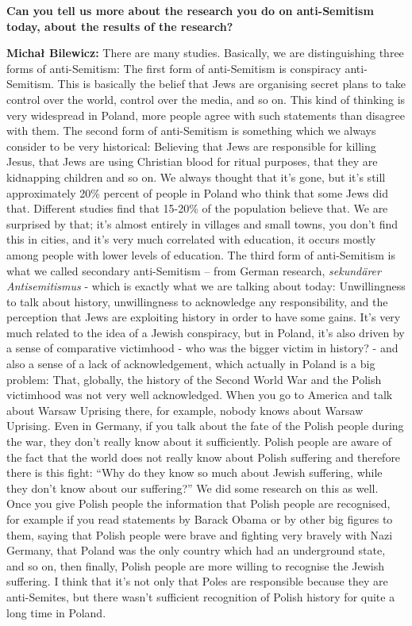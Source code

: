 \textbf{Can you tell us more about the research you do on anti-Semitism today, about the results of the research?} 

\textbf{Michał Bilewicz:} There are many studies. Basically, we are distinguishing three forms of anti-Semitism: The first form of anti-Semitism is conspiracy anti-Semitism. This is basically the belief that Jews are organising secret plans to take control over the world, control over the media, and so on. This kind of thinking is very widespread in Poland, more people agree with such statements than disagree with them. The second form of anti-Semitism is something which we always consider to be very historical: Believing that Jews are responsible for killing Jesus, that Jews are using Christian blood for ritual purposes, that they are kidnapping children and so on. We always thought that it’s gone, but it’s still approximately 20\% percent of people in Poland who think that some Jews did that. Different studies find that 15-20\% of the population believe that. We are surprised by that; it’s almost entirely in villages and small towns, you don’t find this in cities, and it’s very much correlated with education, it occurs mostly among people with lower levels of education. The third form of anti-Semitism is what we called secondary anti-Semitism – from German research, \textit{sekundärer Antisemitismus} - which is exactly what we are talking about today: Unwillingness to talk about history, unwillingness to acknowledge any responsibility, and the perception that Jews are exploiting history in order to have some gains. It’s very much related to the idea of a Jewish conspiracy, but in Poland, it's also driven by a sense of comparative victimhood - who was the bigger victim in history? - and also a sense of a lack of acknowledgement, which actually in Poland is a big problem: That, globally, the history of the Second World War and the Polish victimhood was not very well acknowledged. When you go to America and talk about Warsaw Uprising there, for example, nobody knows about Warsaw Uprising. Even in Germany, if you talk about the fate of the Polish people during the war, they don’t really know about it sufficiently. Polish people are aware of the fact that the world does not really know about Polish suffering and therefore there is this fight: ``Why do they know so much about Jewish suffering, while they don’t know about our suffering?'' We did some research on this as well. Once you give Polish people the information that Polish people are recognised, for example if you read statements by Barack Obama or by other big figures to them, saying that Polish people were brave and fighting very bravely with Nazi Germany, that Poland was the only country which had an underground state, and so on, then finally, Polish people are more willing to recognise the Jewish suffering. I think that it's not only that Poles are responsible because they are anti-Semites, but there wasn't sufficient recognition of Polish history for quite a long time in Poland.